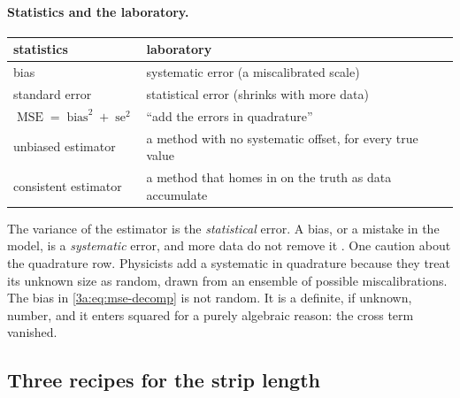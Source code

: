 \paragraph{Statistics and the laboratory.}
\begin{center}\small
\begin{tabular}{@{}ll@{}}
\toprule
statistics & laboratory\\
\midrule
bias & systematic error (a miscalibrated scale)\\
standard error & statistical error (shrinks with more data)\\
$\operatorname{MSE}=\operatorname{bias}^2+\operatorname{se}^2$ & ``add the errors in quadrature''\\
unbiased estimator & a method with no systematic offset, for every true value\\
consistent estimator & a method that homes in on the truth as data accumulate\\
\bottomrule
\end{tabular}
\end{center}

The variance of the estimator is the \emph{statistical} error. A bias, or a
mistake in the model, is a \emph{systematic} error, and more data do not
remove it . One caution about the quadrature
row. Physicists add a systematic in quadrature because they treat its
unknown size as random, drawn from an ensemble of possible miscalibrations.
The bias in \eqref{3a:eq:mse-decomp} is not random. It is a definite, if
unknown, number, and it enters squared for a purely algebraic reason: the
cross term vanished.

\subsection{Three recipes for the strip length}
\label{3a:sec:uniform}

